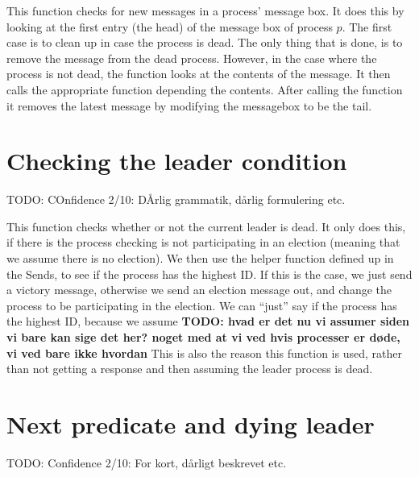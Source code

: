 \documentclass{report}
\begin{document}
This function checks for new messages in a process' message box. It does this by looking at the first entry (the head) of the message box of process $p$. The first case is to clean up in case the process is dead. The only thing that is done, is to remove the message from the dead process. However, in the case where the process is not dead, the function looks at the contents of the message. It then calls the appropriate function depending the contents. After calling the function it removes the latest message by modifying the messagebox to be the tail.

\section{Checking the leader condition}
TODO: COnfidence 2/10: DÅrlig grammatik, dårlig formulering etc.\\
\noindent{}

This function checks whether or not the current leader is dead. It only does this, if there is the process checking is not participating in an election (meaning that we assume there is no election). We then use the helper function defined up in the Sends, to see if the process has the highest ID. If this is the case, we just send a victory message, otherwise we send an election message out, and change the process to be participating in the election.
We can ``just'' say if the process has the highest ID, because we assume \textbf{TODO: hvad er det nu vi assumer siden vi bare kan sige det her? noget med at vi ved hvis processer er døde, vi ved bare ikke hvordan}
This is also the reason this function is used, rather than not getting a response and then assuming the leader process is dead.

\section{Next predicate and dying leader}
TODO: Confidence 2/10: For kort, dårligt beskrevet etc.

\noindent{}
\end{document}
